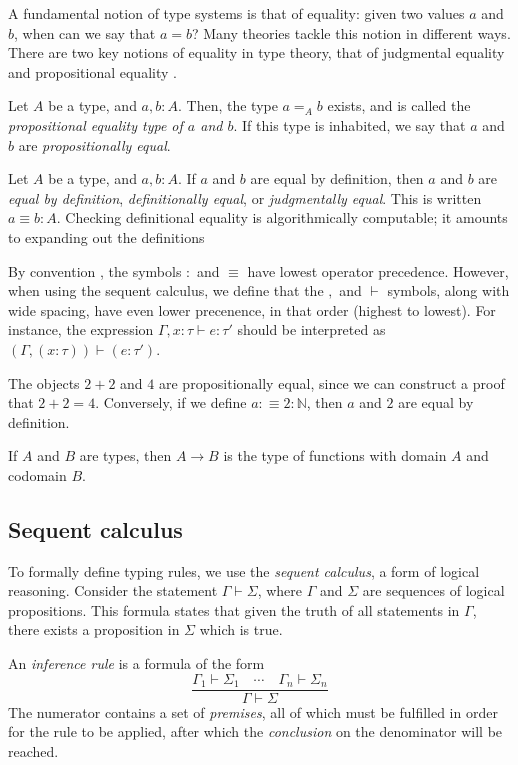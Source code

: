 \documentclass[UKenglish, 11pt, a4paper, parskip=half]{scrbook}
\begin{document}
A fundamental notion of type systems is that of equality: given two values \( a \) and \( b \), when can we say that \( a = b \)?
Many theories tackle this notion in different ways.
There are two key notions of equality in type theory, that of judgmental equality and propositional equality \cite[p.~18--19]{hottbook}.
\begin{defn}
    Let \( A \) be a type, and \( a, b : A \).
    Then, the type \( a =_A b \) exists, and is called the \textit{propositional equality type of \( a \) and \( b \)}.
    If this type is inhabited, we say that \( a \) and \( b \) are \textit{propositionally equal}.
\end{defn}
\begin{defn}
    Let \( A \) be a type, and \( a, b : A \).
    If \( a \) and \( b \) are equal by definition, then \( a \) and \( b \) are \textit{equal by definition}, \textit{definitionally equal}, or \textit{judgmentally equal}.
    This is written \( a \equiv b : A \).
    Checking definitional equality is algorithmically computable; it amounts to expanding out the definitions
\end{defn}
By convention \cite[p.~19]{hottbook}, the symbols \( : \) and \( \equiv \) have lowest operator precedence.
However, when using the sequent calculus, we define that the \( , \) and \( \vdash \) symbols, along with wide spacing, have even lower precenence, in that order (highest to lowest).
For instance, the expression \( \Gamma, x : \tau \vdash e : \tau' \) should be interpreted as \( (\Gamma, (x : \tau)) \vdash (e : \tau') \).
\begin{eg}
    The objects \( 2 + 2 \) and \( 4 \) are propositionally equal, since we can construct a proof that \( 2 + 2 = 4 \).
    Conversely, if we define \( a :\equiv 2 : \mathbb N \), then \( a \) and \( 2 \) are equal by definition.
\end{eg}
\begin{defn}
    If \( A \) and \( B \) are types, then \( A \to B \) is the type of functions with domain \( A \) and codomain \( B \).
\end{defn}

\subsection{Sequent calculus}

To formally define typing rules, we use the \textit{sequent calculus}, a form of logical reasoning.
Consider the statement \( \Gamma \vdash \Sigma \), where \( \Gamma \) and \( \Sigma \) are sequences of logical propositions.
This formula states that given the truth of all statements in \( \Gamma \), there exists a proposition in \( \Sigma \) which is true.
\begin{defn}
    An \textit{inference rule} is a formula of the form
    \[ \frac{\Gamma_1 \vdash \Sigma_1\quad \cdots \quad\Gamma_n \vdash \Sigma_n}{\Gamma \vdash \Sigma} \]
    The numerator contains a set of \textit{premises}, all of which must be fulfilled in order for the rule to be applied, after which the \textit{conclusion} on the denominator will be reached.
\end{defn}
\fi{}
\end{document}
